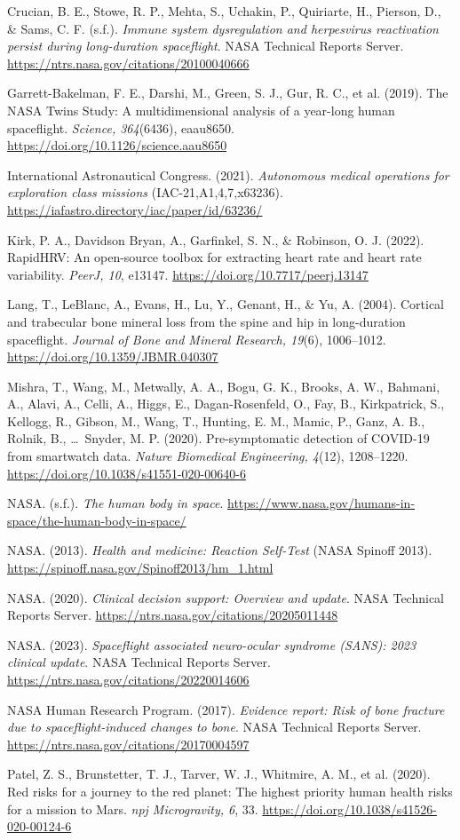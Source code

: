 \documentclass[11pt,a4paper]{article}
\begin{document}
Crucian, B. E., Stowe, R. P., Mehta, S., Uchakin, P., Quiriarte, H., Pierson, D., \& Sams, C. F. (s.f.). \emph{Immune system dysregulation and herpesvirus reactivation persist during long-duration spaceflight}. NASA Technical Reports Server. \url{https://ntrs.nasa.gov/citations/20100040666}

Garrett-Bakelman, F. E., Darshi, M., Green, S. J., Gur, R. C., et al. (2019). The NASA Twins Study: A multidimensional analysis of a year-long human spaceflight. \emph{Science, 364}(6436), eaau8650. \url{https://doi.org/10.1126/science.aau8650}

International Astronautical Congress. (2021). \emph{Autonomous medical operations for exploration class missions} (IAC-21,A1,4,7,x63236). \url{https://iafastro.directory/iac/paper/id/63236/}

Kirk, P. A., Davidson Bryan, A., Garfinkel, S. N., \& Robinson, O. J. (2022). RapidHRV: An open-source toolbox for extracting heart rate and heart rate variability. \emph{PeerJ, 10}, e13147. \url{https://doi.org/10.7717/peerj.13147}

Lang, T., LeBlanc, A., Evans, H., Lu, Y., Genant, H., \& Yu, A. (2004). Cortical and trabecular bone mineral loss from the spine and hip in long-duration spaceflight. \emph{Journal of Bone and Mineral Research, 19}(6), 1006–1012. \url{https://doi.org/10.1359/JBMR.040307}

Mishra, T., Wang, M., Metwally, A. A., Bogu, G. K., Brooks, A. W., Bahmani, A., Alavi, A., Celli, A., Higgs, E., Dagan-Rosenfeld, O., Fay, B., Kirkpatrick, S., Kellogg, R., Gibson, M., Wang, T., Hunting, E. M., Mamic, P., Ganz, A. B., Rolnik, B., \dots\ Snyder, M. P. (2020). Pre-symptomatic detection of COVID-19 from smartwatch data. \emph{Nature Biomedical Engineering, 4}(12), 1208–1220. \url{https://doi.org/10.1038/s41551-020-00640-6}

NASA. (s.f.). \emph{The human body in space}. \url{https://www.nasa.gov/humans-in-space/the-human-body-in-space/}

NASA. (2013). \emph{Health and medicine: Reaction Self-Test} (NASA Spinoff 2013). \url{https://spinoff.nasa.gov/Spinoff2013/hm_1.html}

NASA. (2020). \emph{Clinical decision support: Overview and update}. NASA Technical Reports Server. \url{https://ntrs.nasa.gov/citations/20205011448}

NASA. (2023). \emph{Spaceflight associated neuro-ocular syndrome (SANS): 2023 clinical update}. NASA Technical Reports Server. \url{https://ntrs.nasa.gov/citations/20220014606}

NASA Human Research Program. (2017). \emph{Evidence report: Risk of bone fracture due to spaceflight-induced changes to bone}. NASA Technical Reports Server. \url{https://ntrs.nasa.gov/citations/20170004597}

Patel, Z. S., Brunstetter, T. J., Tarver, W. J., Whitmire, A. M., et al. (2020). Red risks for a journey to the red planet: The highest priority human health risks for a mission to Mars. \emph{npj Microgravity, 6}, 33. \url{https://doi.org/10.1038/s41526-020-00124-6}

\endgroup
\end{document}
